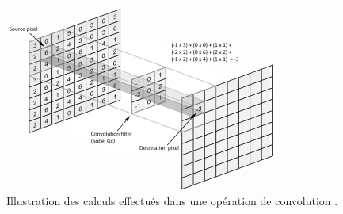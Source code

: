 



\begin{figure}[H]%
	\centering
	\includegraphics[width=0.8\textwidth]{images/cnn_kernel_filter}
	\caption[Illustration des calculs effectués dans une opération de convolution.]{Illustration des calculs effectués dans une opération de convolution \cite{antoine2018apprentissage}.}
	\label{fig:cnn_kernel_filter}
\end{figure}


